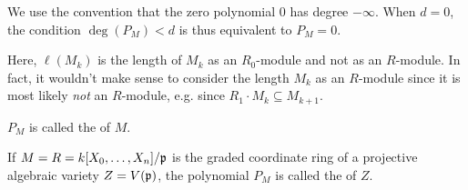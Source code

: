 \documentclass[a4paper,parskip=half,numbers=enddot, DIV=12]{scrreprt}
\begin{document}
\begin{rem*}
	\begin{alphanumerate}
		\item 
		We use the convention that the zero polynomial 0 has degree $-\infty$. When $d=0$, the condition $\deg(P_M) <d$ is thus equivalent to $P_M = 0$.
		\item  Here, $\ell(M_k)$ is the length of $M_k$ as an $R_0$-module and not as an $R$-module. In fact, it wouldn't make sense to consider the length $M_k$ as an $R$-module since it is most likely \emph{not} an $R$-module, e.g. since $R_1\cdot M_k\subseteq M_{k+1}$.
	\end{alphanumerate}
\end{rem*}
\begin{defi}
    $P_M$ is called the  of $M$.
\end{defi}
\begin{defi} 
    If $M=R=k[X_0,\ldots, X_n]/\mathfrak{p}$ is the graded coordinate ring of a projective algebraic variety $Z=V(\mathfrak{p})$, the polynomial $P_M$ is called the  of $Z$.
\end{defi}
\end{document}
